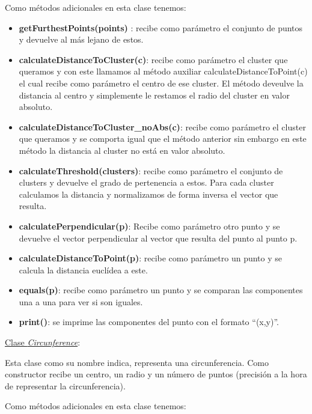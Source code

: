 \documentclass[conference,a4paper]{IEEEtran}
\begin{document}
Como métodos adicionales en esta clase tenemos:

\begin{itemize}

	\item{\textbf{getFurthestPoints(points)	}: recibe como parámetro el conjunto de puntos y devuelve al más lejano de estos.}
	\item{\textbf{calculateDistanceToCluster(c)}: recibe como parámetro el cluster que queramos y con este llamamos al método auxiliar calculateDistanceToPoint(c) el cual recibe como parámetro el centro de ese cluster. El método deveulve la distancia al centro y simplemente le restamos el radio del cluster en valor absoluto.}
	\item{\textbf{calculateDistanceToCluster\_noAbs(c)}: recibe como parámetro el cluster que queramos y se comporta igual que el método anterior sin embargo en este método la distancia al cluster no está en valor absoluto.}
	\item{\textbf{calculateThreshold(clusters)}: recibe como parámetro el conjunto de clusters y devuelve el grado de pertenencia a estos. Para cada cluster calculamos la distancia y normalizamos de forma inversa el vector que resulta.}
	\item{\textbf{calculatePerpendicular(p)}: Recibe como parámetro otro punto y se devuelve el vector perpendicular al vector que resulta del punto al punto p.}
	\item{\textbf{calculateDistanceToPoint(p)}: recibe como parámetro un punto y se calcula la distancia euclídea a este.}
	\item{\textbf{equals(p)}: recibe como parámetro un punto y se comparan las componentes una a una para ver si son iguales.}
	\item{\textbf{print()}: se imprime las componentes del punto con el formato “(x,y)”.}

\end{itemize}

\underline{Clase \textit{Circunference}}:

Esta clase como su nombre indica, representa una circunferencia. Como constructor recibe un centro, un radio y un número de puntos (precisión a la hora de representar la circunferencia).

Como métodos adicionales en esta clase tenemos:
\end{document}
